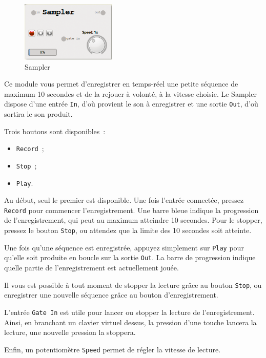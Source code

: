 \documentclass[a4paper,oneside,frenchb,10pt]{article}
\begin{document}
\begin{multicols}{2}
\begin{figure}[H]
\centering
\includegraphics[width=4.5cm]{../img/png/sampler.png}
\caption{Sampler}
\end{figure}

Ce module vous permet d'enregistrer en temps-réel une petite séquence de
maximum 10 secondes et de la rejouer à volonté, à la vitesse choisie. Le
Sampler dispose d'une entrée \verb!In!, d'où provient le son à
enregistrer et une sortie \verb!Out!, d'où sortira le son produit.

Trois boutons sont disponibles~:

\begin{itemize}
\item
  \verb!Record!~;
\item
  \verb!Stop!~;
\item
  \verb!Play!.
\end{itemize}
\end{multicols}

Au début, seul le premier est disponible. Une fois l'entrée connectée,
pressez \verb!Record! pour commencer l'enregistrement. Une barre bleue
indique la progression de l'enregistrement, qui peut au maximum
atteindre 10 secondes. Pour le stopper, pressez le bouton \verb!Stop!, ou
attendez que la limite des 10 secondes soit atteinte.

Une fois qu'une séquence est enregistrée, appuyez simplement sur
\verb!Play! pour qu'elle soit produite en boucle sur la sortie
\verb!Out!. La barre de progression indique quelle partie de
l'enregistrement est actuellement jouée.

Il vous est possible à tout moment de stopper la lecture grâce au bouton
\verb!Stop!, ou enregistrer une nouvelle séquence grâce au bouton
d'enregistrement.

L'entrée \verb!Gate In! est utile pour lancer ou stopper la lecture de
l'enregistrement. Ainsi, en branchant un clavier virtuel dessus, la
pression d'une touche lancera la lecture, une nouvelle pression la
stoppera.

Enfin, un potentiomètre \verb!Speed! permet de régler la vitesse de
lecture.
\end{document}
